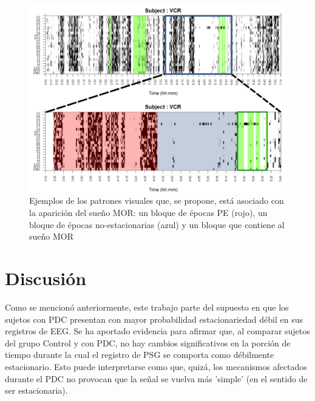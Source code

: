 \begin{figure}
\includegraphics[width=\textwidth]
{./img_ejemplos/zoom_VCR.pdf}
\caption{Ejemplos de los patrones visuales que, se propone, está asociado con la aparición del
sueño MOR: un bloque de épocas PE (rojo), un bloque de épocas no-estacionarias (azul) y un 
bloque que contiene al sueño MOR}
\label{patroncito}
\end{figure}


\section{Discusión}

Como se mencionó anteriormente, este trabajo parte del supuesto en que los sujetos con PDC 
presentan con mayor probabilidad estacionariedad débil en sus registros de EEG.
Se ha aportado evidencia para afirmar que, al comparar sujetos del grupo Control y con PDC, no hay 
cambios significativos en la porción de tiempo durante la cual el registro de PSG se comporta 
como débilmente estacionario. 
Esto puede interpretarse como que, quizá, los mecanismos afectados durante el PDC no provocan que 
la señal se vuelva más 'simple' (en el sentido de ser estacionaria).

